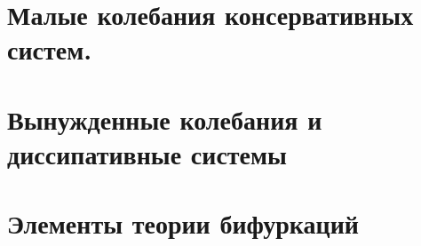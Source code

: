 


\section{Малые колебания консервативных систем.}

% 

\section{Вынужденные колебания и диссипативные системы}


\section{Элементы теории бифуркаций}

